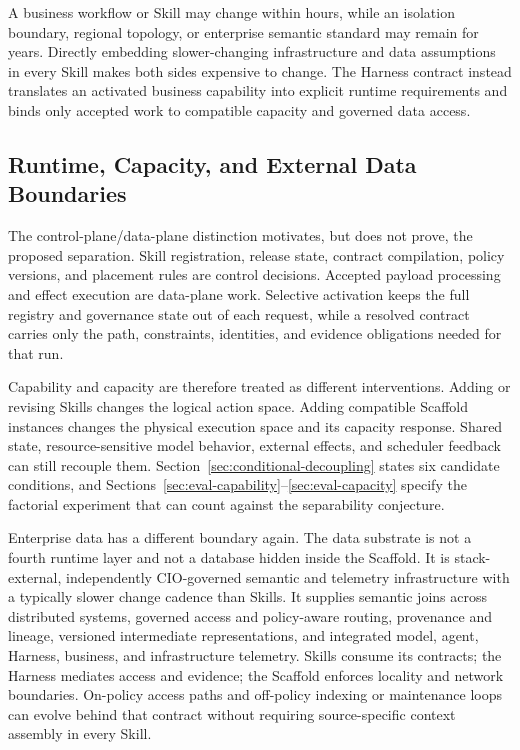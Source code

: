 A business workflow or Skill may change within hours, while an isolation boundary, regional topology, or enterprise semantic standard may remain for years. Directly embedding slower-changing infrastructure and data assumptions in every Skill makes both sides expensive to change. The Harness contract instead translates an activated business capability into explicit runtime requirements and binds only accepted work to compatible capacity and governed data access.

\subsection{Runtime, Capacity, and External Data Boundaries}

The control-plane/data-plane distinction motivates, but does not prove, the proposed separation. Skill registration, release state, contract compilation, policy versions, and placement rules are control decisions. Accepted payload processing and effect execution are data-plane work. Selective activation keeps the full registry and governance state out of each request, while a resolved contract carries only the path, constraints, identities, and evidence obligations needed for that run.

Capability and capacity are therefore treated as different interventions. Adding or revising Skills changes the logical action space. Adding compatible Scaffold instances changes the physical execution space and its capacity response. Shared state, resource-sensitive model behavior, external effects, and scheduler feedback can still recouple them. Section~\ref{sec:conditional-decoupling} states six candidate conditions, and Sections~\ref{sec:eval-capability}--\ref{sec:eval-capacity} specify the factorial experiment that can count against the separability conjecture.

Enterprise data has a different boundary again. The data substrate is not a fourth runtime layer and not a database hidden inside the Scaffold. It is stack-external, independently CIO-governed semantic and telemetry infrastructure with a typically slower change cadence than Skills. It supplies semantic joins across distributed systems, governed access and policy-aware routing, provenance and lineage, versioned intermediate representations, and integrated model, agent, Harness, business, and infrastructure telemetry. Skills consume its contracts; the Harness mediates access and evidence; the Scaffold enforces locality and network boundaries. On-policy access paths and off-policy indexing or maintenance loops can evolve behind that contract without requiring source-specific context assembly in every Skill.

